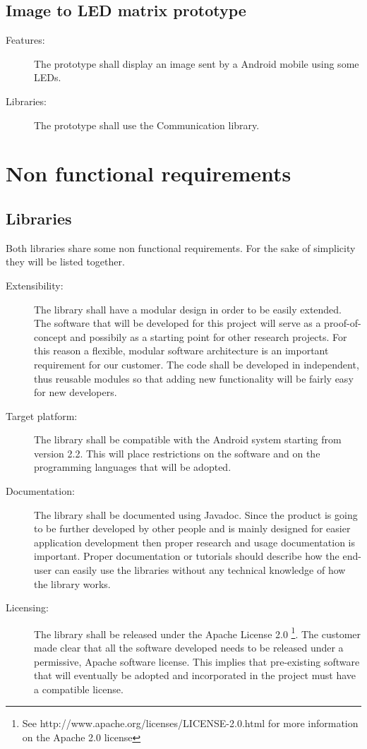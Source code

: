 	\subsection{Image to LED matrix prototype}
	\begin{description}
		\item[Features:] The prototype shall display an image sent by a Android
		mobile using some LEDs.
		\item[Libraries:] The prototype shall use the Communication library.
		\item[]
	\end{description}

\newpage

\section{Non functional requirements}

\subsection{Libraries}

Both libraries share some non functional requirements.
For the sake of simplicity they will be listed together.

\begin{description}
	\item[Extensibility:] The library shall have a modular design
	in order to be easily extended. The software that will be developed for
	this project will serve as a proof-of-concept and possibily as a starting point
	for other research projects. For this reason a flexible, modular software
	architecture is an important requirement for our customer. The code shall be
	developed in independent, thus reusable modules so that adding new functionality
	will be fairly easy for new developers.
	\item[Target platform:] The library shall be compatible with the Android
	system starting from version 2.2. This will place restrictions on the software
	and on the programming languages that will be adopted.
	\item[Documentation:] The library shall be documented using Javadoc.
	Since the product is going to be further developed by other people and is
	mainly designed for easier application development then proper research and usage
	documentation is important. Proper documentation or tutorials should describe how
	the end-user can easily use the libraries without any technical knowledge of how
	the library works.
	\item[Licensing:] The library shall be released under the Apache License 2.0 \footnote{See 
           http://www.apache.org/licenses/LICENSE-2.0.html for more information on the Apache 2.0 license}.
	The customer made clear that all the software developed needs to be released
	under a permissive, Apache software license. This implies that pre-existing
	software that will eventually be adopted and incorporated in the project must
	have a compatible license.
\end{description}


